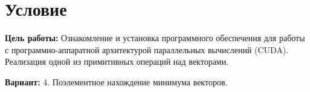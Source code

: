 \section{Условие}
{\bfseries Цель работы:} Ознакомление и установка программного обеспечения для работы с программно-аппаратной архитектурой параллельных вычислений (CUDA). Реализация одной из примитивных операций над векторами.

{\bfseries Вариант:} 4. Поэлементное нахождение минимума векторов.
